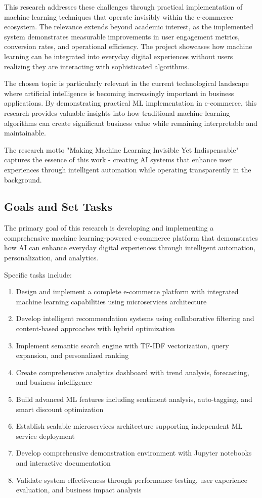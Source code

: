 \documentclass[12pt]{article}
\begin{document}
This research addresses these challenges through practical implementation of machine learning techniques that operate invisibly within the e-commerce ecosystem. The relevance extends beyond academic interest, as the implemented system demonstrates measurable improvements in user engagement metrics, conversion rates, and operational efficiency. The project showcases how machine learning can be integrated into everyday digital experiences without users realizing they are interacting with sophisticated algorithms.

The chosen topic is particularly relevant in the current technological landscape where artificial intelligence is becoming increasingly important in business applications. By demonstrating practical ML implementation in e-commerce, this research provides valuable insights into how traditional machine learning algorithms can create significant business value while remaining interpretable and maintainable.

The research motto "Making Machine Learning Invisible Yet Indispensable" captures the essence of this work - creating AI systems that enhance user experiences through intelligent automation while operating transparently in the background.

\subsection{Goals and Set Tasks}
The primary goal of this research is developing and implementing a comprehensive machine learning-powered e-commerce platform that demonstrates how AI can enhance everyday digital experiences through intelligent automation, personalization, and analytics.

Specific tasks include:
\begin{enumerate}
    \item Design and implement a complete e-commerce platform with integrated machine learning capabilities using microservices architecture
    \item Develop intelligent recommendation systems using collaborative filtering and content-based approaches with hybrid optimization
    \item Implement semantic search engine with TF-IDF vectorization, query expansion, and personalized ranking
    \item Create comprehensive analytics dashboard with trend analysis, forecasting, and business intelligence
    \item Build advanced ML features including sentiment analysis, auto-tagging, and smart discount optimization
    \item Establish scalable microservices architecture supporting independent ML service deployment
    \item Develop comprehensive demonstration environment with Jupyter notebooks and interactive documentation
    \item Validate system effectiveness through performance testing, user experience evaluation, and business impact analysis
\end{enumerate}
\end{document}
